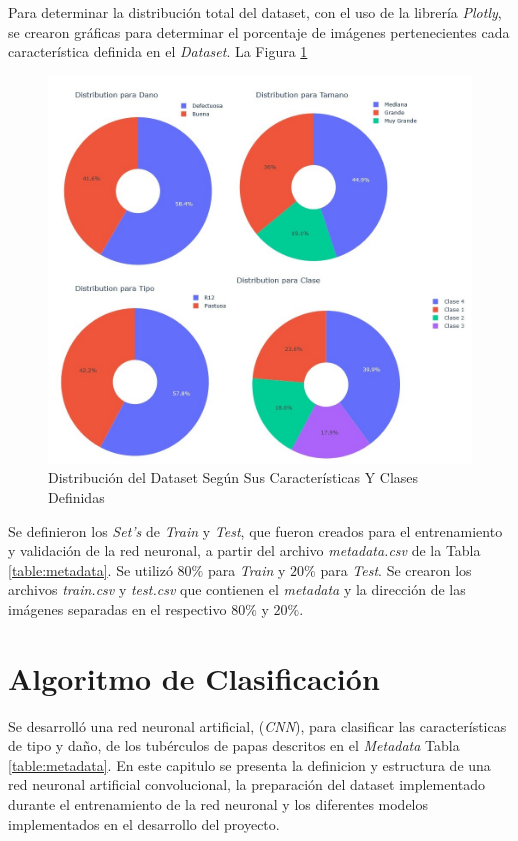 	Para determinar la distribución total del dataset, con el uso de la librería \textit{Plotly}, se crearon gráficas para determinar el porcentaje de imágenes pertenecientes cada característica definida en el \textit{Dataset}. La Figura \ref{fig:distribuciontipo}
		
	\begin{figure}[ht]
		\centering
		\includegraphics[scale=0.4]{Figs/Distribucion.jpg}
		\caption{Distribución del Dataset Según Sus Características Y Clases Definidas}
		\label{fig:distribuciontipo}
	\end{figure}

	Se definieron los \textit{Set's} de \textit{Train} y \textit{Test}, que fueron creados para el entrenamiento y validación de la red neuronal, a partir del archivo \textit{metadata.csv} de la Tabla \ref{table:metadata}. Se utilizó $80\%$ para \textit{Train} y $20\%$ para \textit{Test}. Se crearon los archivos \textit{train.csv} y \textit{test.csv} que contienen el \textit{metadata} y la dirección de las imágenes separadas en el respectivo $80\%$ y $20\%$.



\chapter{Algoritmo de Clasificación}

Se desarrolló una red neuronal artificial, (\textit{CNN}), para clasificar las características de tipo y daño, de los tubérculos de papas descritos en el \textit{Metadata} Tabla \ref{table:metadata}. En este capitulo se presenta la definicion y estructura de una red neuronal artificial convolucional, la preparación del dataset implementado durante el entrenamiento de la red neuronal y los diferentes modelos implementados en el desarrollo del proyecto.

